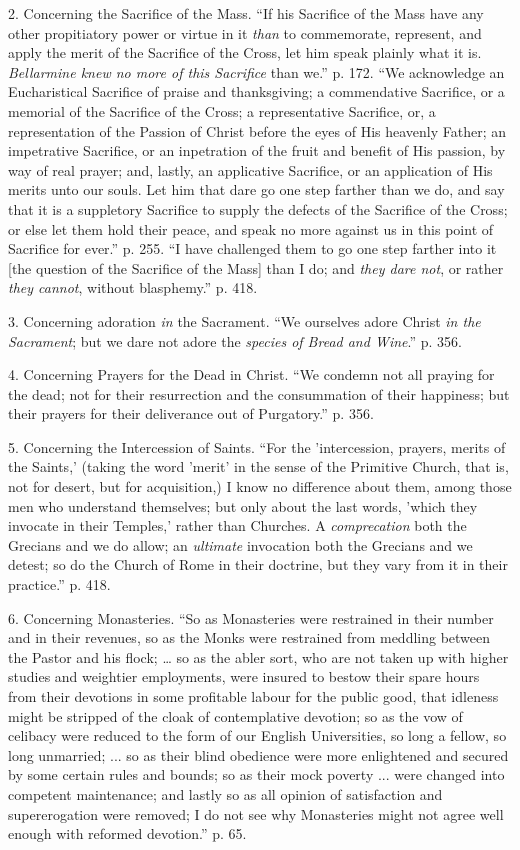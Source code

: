 2. Concerning the Sacrifice of the Mass. ``If
his Sacrifice of the Mass have any other propitiatory power or virtue
in it \emph{than} to commemorate, represent, and apply the merit of
the Sacrifice of the Cross, let him speak plainly what it is. \emph{Bellarmine
knew no more of this Sacrifice} than we.'' p. 172. ``We
acknowledge an Eucharistical Sacrifice of praise and thanksgiving; a
commendative Sacrifice, or a memorial of the Sacrifice of the Cross; a
representative Sacrifice, or, a representation of the Passion of
Christ before the eyes of His heavenly Father; an impetrative
Sacrifice, or an inpetration of the fruit and benefit of His passion,
by way of real prayer; and, lastly, an applicative Sacrifice, or an
application of His merits unto our souls. Let him that dare go one
step farther than we do, and say that it is a suppletory Sacrifice to
supply the defects of the Sacrifice of the Cross; or else let them
hold their peace, and speak no more against us in this point of
Sacrifice for ever.'' p. 255. ``I have challenged them to go one
step farther into it [the question of the Sacrifice of the Mass] than
I do; and \emph{they dare not}, or rather \emph{they cannot}, without
blasphemy.'' p. 418.

3. Concerning adoration \emph{in} the Sacrament. ``We ourselves adore Christ \emph{in the Sacrament}; but we dare not
adore the \emph{species of Bread and Wine}.'' p. 356.

4. Concerning Prayers for the Dead in Christ. ``We condemn not all praying for the dead; not for their resurrection
and the consummation of their happiness; but their prayers for their
deliverance out of Purgatory.'' p. 356.

5. Concerning the Intercession of Saints. ``For
the 'intercession, prayers, merits of the Saints,' (taking the word
'merit' in the sense of the Primitive Church, that is, not for desert,
but for acquisition,) I know no difference about them, among those men
who understand themselves; but only about the last words, 'which they
invocate in their Temples,' rather than Churches. A \emph{comprecation}
both the Grecians and we do allow; an \emph{ultimate} invocation
both the Grecians and we detest; so do the Church of Rome in their
doctrine, but they vary from it in their practice.'' p. 418.

6. Concerning Monasteries. ``So as Monasteries
were restrained in their number and in their revenues, so as the Monks
were restrained from meddling between the Pastor and his flock; … so
as the abler sort, who are not taken up with higher studies and
weightier employments, were insured to bestow their spare hours from
their devotions in some profitable labour for the public good, that
idleness might be stripped of the cloak of contemplative devotion; so
as the vow of celibacy were reduced to the form of our English
Universities, so long a fellow, so long unmarried; ... so as their
blind obedience were more enlightened and secured by some certain
rules and bounds; so as their mock poverty ... were changed into
competent maintenance; and lastly so as all opinion of satisfaction
and supererogation were removed; I do not see why Monasteries might
not agree well enough with reformed devotion.'' p. 65.


